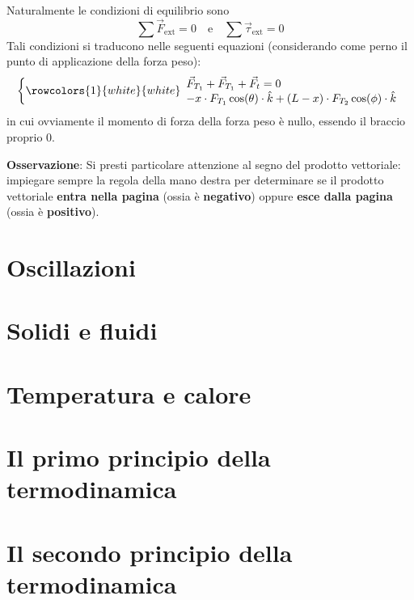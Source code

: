 \documentclass[a4paper]{extarticle}
\begin{document}
\noindent
Naturalmente le condizioni di equilibrio sono
\[\sum \vec F_{\text{ext}} = 0 \hspace{1em} \text{e} \hspace{1em} \sum \vec \tau_{\text{ext}} = 0\]
Tali condizioni si traducono nelle seguenti equazioni (considerando come perno il punto di applicazione della forza peso):
\[
  \left\{
  \rowcolors{1}{white}{white}
  \begin{array}{l}
    \vec F_{T_1} + \vec F_{T_1} + \vec F_t = 0\\
    -x \cdot F_{T_1} \cos(\theta) \cdot \hat{k} + (L-x) \cdot F_{T_2} \cos(\phi) \cdot \hat{k}\\
  \end{array}
  \right.
\]
in cui ovviamente il momento di forza della forza peso è nullo, essendo il braccio proprio $0$.

\vspace{1em}
\noindent
\textbf{Osservazione}: Si presti particolare attenzione al segno del prodotto vettoriale: impiegare sempre la regola della mano destra per determinare se il prodotto vettoriale \textbf{entra nella pagina} (ossia è \textbf{negativo}) oppure \textbf{esce dalla pagina} (ossia è \textbf{positivo}).



\newpage
\section{Oscillazioni}

\newpage
\section{Solidi e fluidi}

\newpage
\section{Temperatura e calore}

\newpage
\section{Il primo principio della termodinamica}

\newpage
\section{Il secondo principio della termodinamica}
\end{document}
